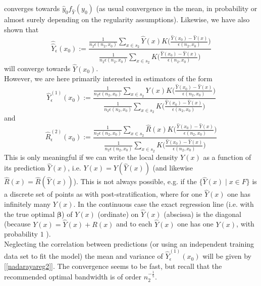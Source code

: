 \documentclass[a4paper,12pt,leqno, titlepage]{article}
\begin{document}
\begin{appendix}
converges towards $\hat{y}_0f_{\hat{Y}}(y_0)$ (as usual convergence in the mean, in probability or almost surely depending on the regularity assumptions). Likewise, we have also shown that
\begin{equation}\label{consistency2}
\hat{\hat{Y}}_{\epsilon}(x_0):=\frac{ \frac{1}{n_2\epsilon(n_2,x_0)}
\sum_{x\in{s_2}}\hat{Y}(x)K\big(\frac{\hat{Y}(x_0)-\hat{Y}(x)}{\epsilon(n_2,x_0)}\big)}
{\frac{1}{n_2\epsilon(n_2,x_0)}\sum_{x\in{s_2}}K\big(\frac{\hat{Y}(x_0)-\hat{Y}(x)}{\epsilon(n_2,x_0)}\big)}
\end{equation}
will converge towards $\hat{Y}(x_0)$.\\
\noindent However, we are here primarily interested in estimators of the form
\begin{equation}
\hat{Y}^{(1)}_{\epsilon}(x_0):=\frac{ \frac{1}{n_2\epsilon(n_2,x_0)}
\sum_{x\in{s_2}}Y(x)K\big(\frac{\hat{Y}(x_0)-\hat{Y}(x)}{\epsilon(n_2,x_0)}\big)}
{\frac{1}{n_2\epsilon(n_2,x_0)}\sum_{x\in{s_2}}K\big(\frac{\hat{Y}(x_0)-\hat{Y}(x)}{\epsilon(n_2,x_0)}\big)}
\end{equation}
and
\begin{equation}
\hat{R}^{(2)}_{\epsilon}(x_0):=\frac{ \frac{1}{n_2\epsilon(n_2,x_0)}
\sum_{x\in{s_2}}\hat{R}(x)K\big(\frac{\hat{Y}(x_0)-\hat{Y}(x)}{\epsilon(n_2,x_0)}\big)}
{\frac{1}{n_2\epsilon(n_2,x_0)}\sum_{x\in{s_2}}K\big(\frac{\hat{Y}(x_0)-\hat{Y}(x)}{\epsilon(n_2,x_0)}\big)}
\end{equation}
This is only meaningful if we can write the local density $Y(x)$ as a function of its prediction $\hat{Y}(x)$, i.e. $Y(x)=Y(\hat{Y}(x))$ (and likewise $\hat{R}(x)=\hat{R}(\hat{Y}(x))$). This is not always possible, e.g. if the $\{\hat{Y}(x)\mid x\in{F}\}$ is a discrete set of points as with post-stratification, where for one $\hat{Y}(x)$ one has infinitely many $Y(x)$. In the continuous case the exact regression line (i.e. with the true optimal $\pmb{\beta}$) of $Y(x)$ (ordinate) on $\hat{Y}(x)$ (abscissa) is the diagonal (because $Y(x)=\hat{Y}(x)+R(x)$ and to each $\hat{Y}(x)$ one has one $Y(x)$, with probability $1$ ).\\
Neglecting the correlation between predictions (or using an independent training data set to fit the model) the mean and variance of $\hat{Y}^{(1)}_{\epsilon}(x_0)$ will be given by [\ref{nadarayareg2}]. The convergence seems to be fast, but recall that the recommended  optimal bandwidth is of order $n_2^{-\frac{1}{5}}$.


\end{appendix}
\end{document}
